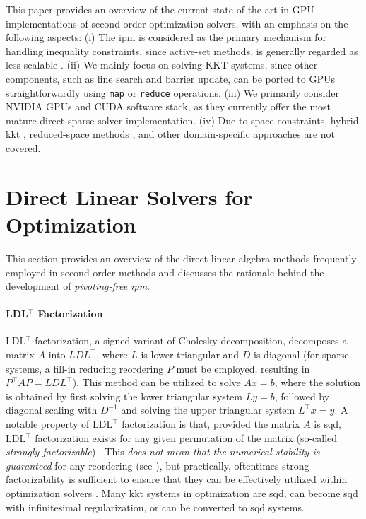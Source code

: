 \documentclass{article}
\begin{document}
This paper provides an overview of the current state of the art in GPU implementations of second-order optimization solvers, with an emphasis on the following aspects:
(i) The \gls*{ipm} is considered as the primary mechanism for handling inequality constraints, since active-set methods, is generally regarded as less scalable \cite{nocedalNumericalOptimization2006}.
(ii) We mainly focus on solving KKT systems, since other components, such as line search and barrier update, can be ported to GPUs straightforwardly using \texttt{map} or \texttt{reduce} operations.
(iii) We primarily consider NVIDIA GPUs and CUDA software stack, as they currently offer the most mature direct sparse solver implementation.
(iv) Due to space constraints, hybrid \gls*{kkt} \cite{regevHyKKTHybridDirectiterative2023}, reduced-space methods \cite{pacaudAcceleratingCondensedInteriorPoint2023}, and other domain-specific approaches \cite{adabagMPCGPURealTimeNonlinear2024} are not covered.

\section{Direct Linear Solvers for Optimization}\label{eqn:linear}
This section provides an overview of the direct linear algebra methods frequently employed in second-order methods and discusses the rationale behind the development of \emph{pivoting-free \gls*{ipm}}.

\paragraph{LDL$^\top$ Factorization}
LDL$^\top$ factorization, a signed variant of Cholesky decomposition, decomposes a matrix $A$ into $LDL^\top$, where $L$ is lower triangular and $D$ is diagonal (for sparse systems, a fill-in reducing reordering $P$ must be employed, resulting in $P^\top A P= L D L^\top$). This method can be utilized to solve $Ax = b$, where the solution is obtained by first solving the lower triangular system $Ly = b$, followed by diagonal scaling with $D^{-1}$ and solving the upper triangular system $L^\top x = y$.
A notable property of LDL$^\top$ factorization is that, provided the matrix $A$ is \gls*{sqd}, LDL$^\top$ factorization exists for any given permutation of the matrix (so-called \emph{strongly factorizable}) \cite{vanderbeiSymmetricQuasidefiniteMatrices1995}.
This \emph{does not mean that the numerical stability is guaranteed} for any reordering (see \cite{vanderbeiSymmetricQuasidefiniteMatrices1995}), but practically, oftentimes strong factorizability is sufficient to ensure that they can be effectively utilized within optimization solvers \cite{stellatoOSQPOperatorSplitting2020}.
Many \gls*{kkt} systems in optimization are \gls*{sqd}, can become \gls*{sqd} with infinitesimal regularization, or can be converted to \gls*{sqd} systems.
\end{document}
